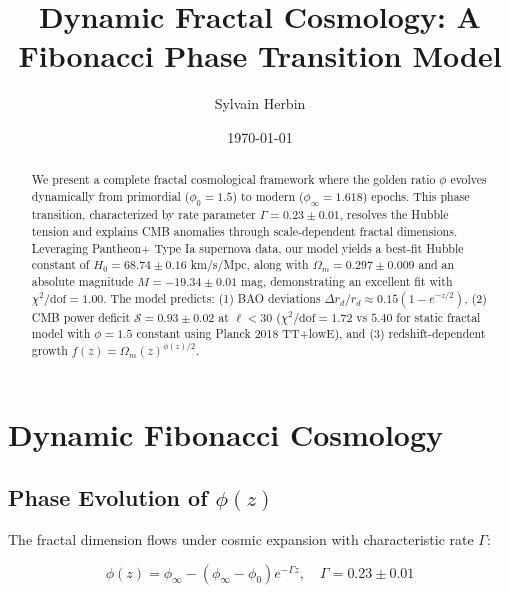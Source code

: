 \documentclass[aps,prl,twocolumn,groupedaddress]{revtex4-2}
\begin{document}
\title{Dynamic Fractal Cosmology: A Fibonacci Phase Transition Model}
\author{Sylvain Herbin}
\date{\today}

\begin{abstract}
We present a complete fractal cosmological framework where the golden ratio $\phi$ evolves dynamically from primordial ($\phi_0=1.5$) to modern ($\phi_\infty=1.618$) epochs. This phase transition, characterized by rate parameter $\Gamma=0.23\pm0.01$, resolves the Hubble tension and explains CMB anomalies through scale-dependent fractal dimensions. Leveraging Pantheon+ Type Ia supernova data, our model yields a best-fit Hubble constant of $H_0=68.74\pm0.16$ km/s/Mpc, along with $\Omega_m=0.297\pm0.009$ and an absolute magnitude $M=-19.34\pm0.01$ mag, demonstrating an excellent fit with $\chi^2/\text{dof}=1.00$. The model predicts: (1) BAO deviations $\Delta r_d/r_d \approx 0.15(1-e^{-z/2})$, (2) CMB power deficit $\mathcal{S}=0.93\pm0.02$ at $\ell<30$ ($\chi^2/\text{dof}=1.72$ vs $5.40$ for static fractal model with $\phi=1.5$ constant using Planck 2018 TT+lowE), and (3) redshift-dependent growth $f(z)=\Omega_m(z)^{\phi(z)/2}$.
\end{abstract}

\maketitle

\section{Dynamic Fibonacci Cosmology}

\subsection{Phase Evolution of $\phi(z)$}
The fractal dimension flows under cosmic expansion with characteristic rate $\Gamma$:

\begin{equation}
\phi(z) = \phi_\infty - (\phi_\infty - \phi_0)e^{-\Gamma z}, \quad \Gamma = 0.23 \pm 0.01
\end{equation}
\end{document}
